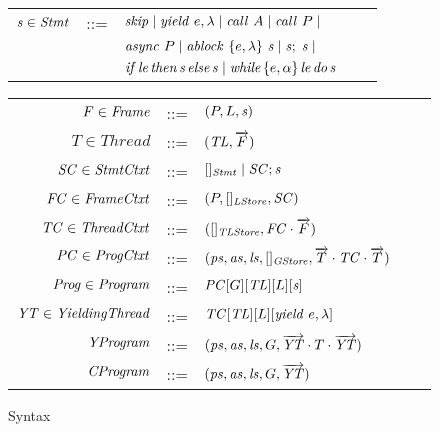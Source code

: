 \begin{figure}
\setlength{\tabcolsep}{3pt}
\scriptsize{
\begin{tabular}{rclcl}
$\mathit{s} \in \mathit{Stmt}$ &::= & $\mathit{skip} \mid \mathit{yield}\ e,\lambda \mid \mathit{call}\ A \mid \mathit{call}\ P \mid$ \\
                  & & $\mathit{async}\ P \mid \mathit{ablock}\ {\{e,\lambda\}}\ {\mathit{s}} \mid \mathit{s};\;\mathit{s} \mid$\\
                  & & $\mathit{if}\hspace{0.5mm}{\mathit{le}}\hspace{0.5mm}\mathit{then}\hspace{0.5mm}{\mathit{s}}\hspace{0.5mm}\mathit{else}\hspace{0.5mm}{\mathit{s}} \mid \mathit{while}\hspace{0.5mm}\{e,\alpha\}\hspace{0.5mm}{\mathit{le}}\hspace{0.5mm}\mathit{do}\hspace{0.5mm}{\mathit{s}}$ \vspace{6pt} \\
\end{tabular}
\begin{tabular}{rclcl}
$F \in \mathit{Frame}$ &::= & $(P, L, \mathit{s})$ \\
$T \in \mathit{Thread}$ &::= &$(\mathit{TL}, \overrightarrow{F})$ \\
$\mathit{SC} \in \mathit{StmtCtxt}$ &::= &$[]_{\mathit{Stmt}} \mid \mathit{SC};\mathit{s}$ \\
$\mathit{FC} \in \mathit{FrameCtxt}$ &::= & $(P, []_{\mathit{LStore}}, \mathit{SC})$ \\
$\mathit{TC} \in \mathit{ThreadCtxt}$ &::= &$([]_{\mathit{TLStore}}, \mathit{FC}\cdot\overrightarrow{F})$ \\
$\mathit{PC} \in \mathit{ProgCtxt}$ &::= & $(\mathit{ps}, \mathit{as}, \mathit{ls}, []_{\mathit{GStore}}, \overrightarrow{T} \cdot \mathit{TC} \cdot \overrightarrow{T})$ \\
$\mathit{Prog} \in \mathit{Program}$ &::= & $\mathit{PC}[G][\mathit{TL}][L][\mathit{s}]$ \vspace{6pt} \\
$\mathit{YT} \in \mathit{YieldingThread}$ &::= &$\mathit{TC}[\mathit{TL}][L][\mathit{yield}\ e,\lambda]$ \\
$\mathit{YProgram}$ &::= & $(\mathit{ps}, \mathit{as}, \mathit{ls}, G, \overrightarrow{\mathit{YT}} \cdot T \cdot \overrightarrow{\mathit{YT}})$ \\
$\mathit{CProgram}$ &::= & $(\mathit{ps}, \mathit{as}, \mathit{ls}, G, \overrightarrow{\mathit{YT}})$
\end{tabular}
}
\caption{Syntax}
\label{fig:syntax}
\end{figure}


